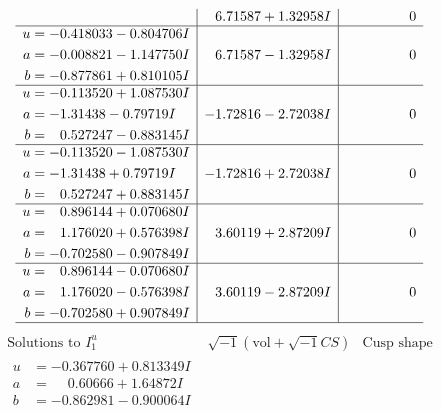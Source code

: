 \documentclass[1p]{elsarticle_modified}
\theoremstyle{definition}
\newcommand{\I}{\sqrt{-1}}
\begin{document}
$$\begin{array}{c|c|c}
 & \phantom{-}6.71587 + 1.32958 I & \phantom{-0.000000 } 0 \\ \hline\begin{aligned}
u &= -0.418033 - 0.804706 I \\
a &= -0.008821 - 1.147750 I \\
b &= -0.877861 + 0.810105 I\end{aligned}
 & \phantom{-}6.71587 - 1.32958 I & \phantom{-0.000000 } 0 \\ \hline\begin{aligned}
u &= -0.113520 + 1.087530 I \\
a &= -1.31438 - 0.79719 I \\
b &= \phantom{-}0.527247 - 0.883145 I\end{aligned}
 & -1.72816 - 2.72038 I & \phantom{-0.000000 } 0 \\ \hline\begin{aligned}
u &= -0.113520 - 1.087530 I \\
a &= -1.31438 + 0.79719 I \\
b &= \phantom{-}0.527247 + 0.883145 I\end{aligned}
 & -1.72816 + 2.72038 I & \phantom{-0.000000 } 0 \\ \hline\begin{aligned}
u &= \phantom{-}0.896144 + 0.070680 I \\
a &= \phantom{-}1.176020 + 0.576398 I \\
b &= -0.702580 - 0.907849 I\end{aligned}
 & \phantom{-}3.60119 + 2.87209 I & \phantom{-0.000000 } 0 \\ \hline\begin{aligned}
u &= \phantom{-}0.896144 - 0.070680 I \\
a &= \phantom{-}1.176020 - 0.576398 I \\
b &= -0.702580 + 0.907849 I\end{aligned}
 & \phantom{-}3.60119 - 2.87209 I & \phantom{-0.000000 } 0\\
 \hline 
 \end{array}$$\newpage$$\begin{array}{c|c|c}  
\text{Solutions to }I^u_{1}& \I (\text{vol} + \sqrt{-1}CS) & \text{Cusp shape}\\
 \hline 
\begin{aligned}
u &= -0.367760 + 0.813349 I \\
a &= \phantom{-}0.60666 + 1.64872 I \\
b &= -0.862981 - 0.900064 I\end{aligned}

\end{array}$$
\end{document}
